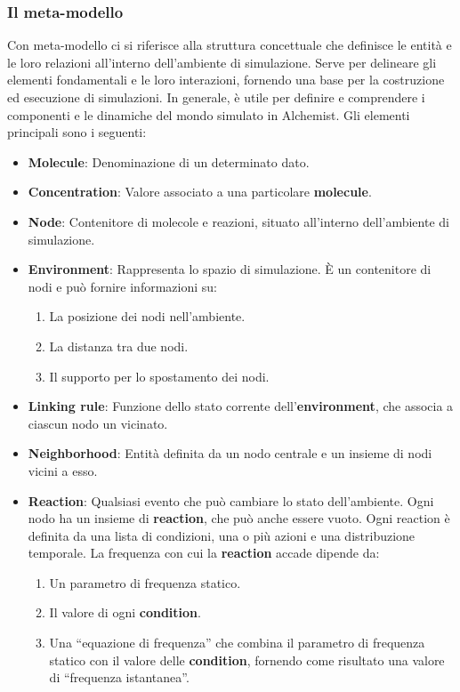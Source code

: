 \subsubsection{Il meta-modello}
Con meta-modello ci si riferisce alla struttura concettuale che definisce le entità e le loro relazioni all'interno dell'ambiente di simulazione. Serve per delineare gli elementi fondamentali e le loro interazioni, fornendo una base per la costruzione ed esecuzione di simulazioni. In generale, è utile per definire e comprendere i componenti e le dinamiche del mondo simulato in Alchemist. Gli elementi principali sono i seguenti:

\begin{itemize}
	\item \textbf{Molecule}:  Denominazione di un determinato dato.
	\item \textbf{Concentration}:  Valore associato a una particolare \textbf{molecule}. 
	\item \textbf{Node}: Contenitore di molecole e reazioni, situato all'interno dell'ambiente di simulazione.
	\item \textbf{Environment}: Rappresenta lo spazio di simulazione. È un contenitore di nodi e può fornire informazioni su:
	\begin{enumerate}
		\item La posizione dei nodi nell'ambiente.
		\item La distanza tra due nodi.
		\item Il supporto per lo spostamento dei nodi.
	\end{enumerate}
	\item \textbf{Linking rule}: Funzione dello stato corrente dell'\textbf{environment}, che associa a ciascun nodo un vicinato.
	\item \textbf{Neighborhood}: Entità definita da un nodo centrale e un insieme di nodi vicini a esso.
	\item \textbf{Reaction}\label{item:reactions}: Qualsiasi evento che può cambiare lo stato dell'ambiente. Ogni nodo ha un insieme di \textbf{reaction}, che può anche essere vuoto. Ogni reaction è definita da una lista di condizioni, una o più azioni e una distribuzione temporale. La frequenza con cui la \textbf{reaction} accade dipende da:
		\begin{enumerate}
		\item Un parametro di frequenza statico.
		\item Il valore di ogni \textbf{condition}.
		\item Una ``equazione di frequenza'' che combina il parametro di frequenza statico con il valore delle \textbf{condition}, fornendo come risultato una valore di ``frequenza istantanea''.

\end{enumerate}
\end{itemize}
